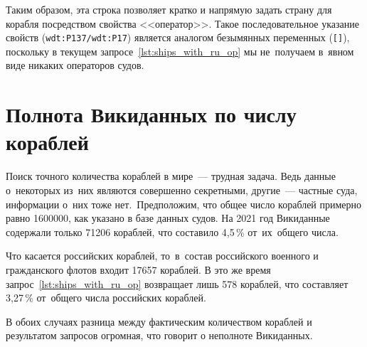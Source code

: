 Таким образом, эта строка позволяет кратко и напрямую задать страну для корабля 
посредством свойства <<оператор>>. 
Такое последовательное указание свойств (\texttt{wdt:P137/wdt:P17}) 
является аналогом безымянных переменных (\lstinline|[]|),
поскольку в текущем запросе~\ref{lst:ships_with_ru_op} 
мы не~получаем в~явном виде никаких операторов судов. 




\newpage
\section{Полнота Викиданных по числу кораблей}

Поиск точного количества кораблей в мире~--- трудная задача. 
Ведь данные о~некоторых из~них являются совершенно секретными, 
другие~--- частные суда, информации о~них тоже нет.\, 
Предположим, что общее число кораблей примерно равно \num{1600000}, 
как указано в базе данных судов. %
На 2021 год Викиданные содержали только \num{71206} кораблей, 
что составило 4,5\,\% от~их~общего числа.


Что касается российских кораблей, 
то~в~состав российского военного и гражданского флотов входит 
\num{17657} кораблей. %
В это же время запрос~\ref{lst:ships_with_ru_op} возвращает лишь 578 кораблей, 
что составляет 3,27\,\% от~общего числа российских кораблей. 

В обоих случаях разница между фактическим количеством кораблей и результатом запросов огромная, что говорит о неполноте Викиданных.







